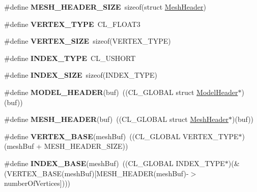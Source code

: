 \begin{DoxyCompactItemize}
\item 
\#define {\bfseries M\+E\+S\+H\+\_\+\+H\+E\+A\+D\+E\+R\+\_\+\+S\+I\+ZE}~sizeof(struct \hyperlink{struct_mesh_header}{Mesh\+Header})\hypertarget{group__g13_ga5b31291343e3a317086f9bcfe99433e7}{}\label{group__g13_ga5b31291343e3a317086f9bcfe99433e7}

\item 
\#define {\bfseries V\+E\+R\+T\+E\+X\+\_\+\+T\+Y\+PE}~C\+L\+\_\+\+F\+L\+O\+A\+T3\hypertarget{group__g13_ga44a0a5af7817f3690aedd52aca28b63d}{}\label{group__g13_ga44a0a5af7817f3690aedd52aca28b63d}

\item 
\#define {\bfseries V\+E\+R\+T\+E\+X\+\_\+\+S\+I\+ZE}~sizeof(V\+E\+R\+T\+E\+X\+\_\+\+T\+Y\+PE)\hypertarget{group__g13_ga14571eb5f0eee95bf614e04c59b0207a}{}\label{group__g13_ga14571eb5f0eee95bf614e04c59b0207a}

\item 
\#define {\bfseries I\+N\+D\+E\+X\+\_\+\+T\+Y\+PE}~C\+L\+\_\+\+U\+S\+H\+O\+RT\hypertarget{group__g13_ga29f7d7e49a78f7d13ca2f709fa0205e5}{}\label{group__g13_ga29f7d7e49a78f7d13ca2f709fa0205e5}

\item 
\#define {\bfseries I\+N\+D\+E\+X\+\_\+\+S\+I\+ZE}~sizeof(I\+N\+D\+E\+X\+\_\+\+T\+Y\+PE)\hypertarget{group__g13_ga33bdc994ac7c8cda7d0df1a3369ab965}{}\label{group__g13_ga33bdc994ac7c8cda7d0df1a3369ab965}

\item 
\#define {\bfseries M\+O\+D\+E\+L\+\_\+\+H\+E\+A\+D\+ER}(buf)~((C\+L\+\_\+\+G\+L\+O\+B\+AL struct \hyperlink{struct_model_header}{Model\+Header}$\ast$)(buf))\hypertarget{group__g13_ga5144dcac23e79d598f2850c3e321e4e0}{}\label{group__g13_ga5144dcac23e79d598f2850c3e321e4e0}

\item 
\#define {\bfseries M\+E\+S\+H\+\_\+\+H\+E\+A\+D\+ER}(buf)~((C\+L\+\_\+\+G\+L\+O\+B\+AL struct \hyperlink{struct_mesh_header}{Mesh\+Header}$\ast$)(buf))\hypertarget{group__g13_ga7e85edf6c75a9e39ed81ea1e01d4f84d}{}\label{group__g13_ga7e85edf6c75a9e39ed81ea1e01d4f84d}

\item 
\#define {\bfseries V\+E\+R\+T\+E\+X\+\_\+\+B\+A\+SE}(mesh\+Buf)~((C\+L\+\_\+\+G\+L\+O\+B\+AL V\+E\+R\+T\+E\+X\+\_\+\+T\+Y\+PE$\ast$)(mesh\+Buf + M\+E\+S\+H\+\_\+\+H\+E\+A\+D\+E\+R\+\_\+\+S\+I\+ZE))\hypertarget{group__g13_ga4b7a84e0f12b4c21c706c4974e755ab3}{}\label{group__g13_ga4b7a84e0f12b4c21c706c4974e755ab3}

\item 
\#define {\bfseries I\+N\+D\+E\+X\+\_\+\+B\+A\+SE}(mesh\+Buf)~((C\+L\+\_\+\+G\+L\+O\+B\+AL I\+N\+D\+E\+X\+\_\+\+T\+Y\+PE$\ast$)(\&(V\+E\+R\+T\+E\+X\+\_\+\+B\+A\+SE(mesh\+Buf)\mbox{[}M\+E\+S\+H\+\_\+\+H\+E\+A\+D\+ER(mesh\+Buf)-\/$>$number\+Of\+Vertices\mbox{]})))\hypertarget{group__g13_gab597a7db413a7bba13f5755024c1be12}{}\label{group__g13_gab597a7db413a7bba13f5755024c1be12}

\end{DoxyCompactItemize}
